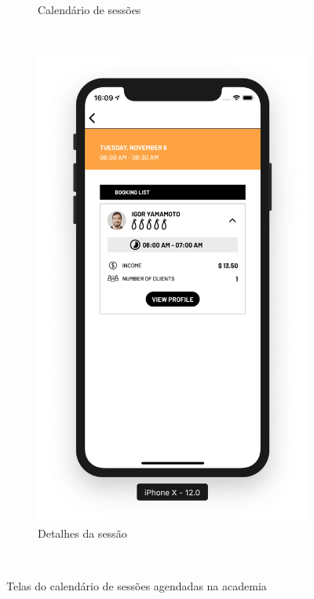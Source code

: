 \begin{figure}[H]
\begin{subfigure}[b]{0.4\textwidth}
        \caption{Calendário de sessões}
        \label{fig:gym-booking-calendar}
    \end{subfigure}
    ~
	\begin{subfigure}[b]{0.4\textwidth}
        \includegraphics[width=\textwidth]{pfc/figuras/gym-booking-detail.png}
        \caption{Detalhes da sessão}
        \label{fig:gym-booking-detail}
    \end{subfigure}
    ~
    \caption{Telas do calendário de sessões agendadas na academia}
    \label{fig:gym-calendar}
\end{figure}

